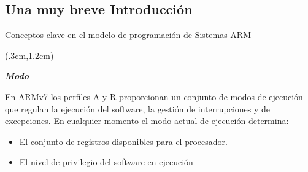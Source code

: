 \documentclass[usenames,table,dvipsnames,aspectratio=169]{beamer}
\begin{document}
\subsection{Una muy breve Introducción}
\begin{frame}{Conceptos clave en el modelo de programación de Sistemas ARM}
 \begin{textblock*}{\textwidth}(.3cm,1.2cm)
  \begin{tcolorbox}[enhanced,colframe=blue!70!black, colback=blue!4, drop fuzzy shadow=black!40, boxrule=0.8pt, boxsep=2mm, left=2mm, right=2mm, top=1mm, bottom=1mm, arc=2mm]
   \textbf{\textit{Modo}}

   En ARMv7 los perfiles A y R proporcionan un conjunto de modos de ejecución que regulan la ejecución del software, la gestión de interrupciones y de excepciones. En cualquier momento el modo actual de ejecución determina:
   \begin{itemize}
    \item El conjunto de registros disponibles para el procesador.
    \item El nivel de privilegio del software en ejecución
   \end{itemize}
  \end{tcolorbox}
 \end{textblock*}
\end{frame}
\end{document}
